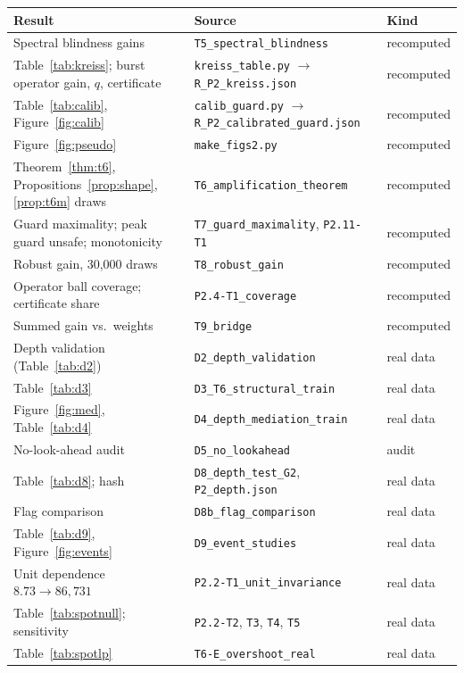 \documentclass[12pt]{article}
\theoremstyle{definition}
\theoremstyle{remark}
\begin{document}
\begin{longtable}{p{}p{}p{}}
\toprule
Result & Source & Kind\\
\midrule
\endhead
Spectral blindness gains & \texttt{T5\_spectral\_blindness} & recomputed\\
Table~\ref{tab:kreiss}; burst operator gain, $q$, certificate & \texttt{kreiss\_table.py} $\to$ \texttt{R\_P2\_kreiss.json} & recomputed\\
Table~\ref{tab:calib}, Figure~\ref{fig:calib} & \texttt{calib\_guard.py} $\to$ \texttt{R\_P2\_calibrated\_guard.json} & recomputed\\
Figure~\ref{fig:pseudo} & \texttt{make\_figs2.py} & recomputed\\
Theorem~\ref{thm:t6}, Propositions~\ref{prop:shape}, \ref{prop:t6m} draws & \texttt{T6\_amplification\_theorem} & recomputed\\
Guard maximality; peak guard unsafe; monotonicity & \texttt{T7\_guard\_maximality}, \texttt{P2.11-T1} & recomputed\\
Robust gain, 30,000 draws & \texttt{T8\_robust\_gain} & recomputed\\
Operator ball coverage; certificate share & \texttt{P2.4-T1\_coverage} & recomputed\\
Summed gain vs.\ weights & \texttt{T9\_bridge} & recomputed\\
Depth validation (Table~\ref{tab:d2}) & \texttt{D2\_depth\_validation} & real data\\
Table~\ref{tab:d3} & \texttt{D3\_T6\_structural\_train} & real data\\
Figure~\ref{fig:med}, Table~\ref{tab:d4} & \texttt{D4\_depth\_mediation\_train} & real data\\
No-look-ahead audit & \texttt{D5\_no\_lookahead} & audit\\
Table~\ref{tab:d8}; hash & \texttt{D8\_depth\_test\_G2}, \texttt{P2\_depth.json} & real data\\
Flag comparison & \texttt{D8b\_flag\_comparison} & real data\\
Table~\ref{tab:d9}, Figure~\ref{fig:events} & \texttt{D9\_event\_studies} & real data\\
Unit dependence $8.73\to86{,}731$ & \texttt{P2.2-T1\_unit\_invariance} & real data\\
Table~\ref{tab:spotnull}; sensitivity & \texttt{P2.2-T2}, \texttt{T3}, \texttt{T4}, \texttt{T5} & real data\\
Table~\ref{tab:spotlp} & \texttt{T6-E\_overshoot\_real} & real data\\

\end{longtable}
\end{document}
